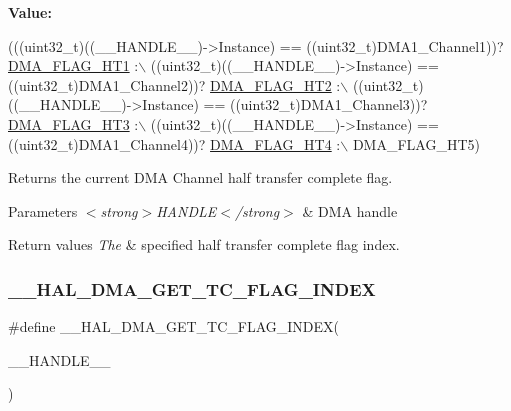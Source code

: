 {\bfseries Value\+:}
\begin{DoxyCode}
(((uint32\_t)((\_\_HANDLE\_\_)->Instance) == ((uint32\_t)DMA1\_Channel1))? \hyperlink{group___d_m_a__flag__definitions_ga4317f6260e1aecc4f5fe882fc043f606}{DMA\_FLAG\_HT1} :\(\backslash\)
 ((uint32\_t)((\_\_HANDLE\_\_)->Instance) == ((uint32\_t)DMA1\_Channel2))? \hyperlink{group___d_m_a__flag__definitions_gab21f437ec8a55a600e5ca2af9416baba}{DMA\_FLAG\_HT2} :\(\backslash\)
 ((uint32\_t)((\_\_HANDLE\_\_)->Instance) == ((uint32\_t)DMA1\_Channel3))? \hyperlink{group___d_m_a__flag__definitions_gad28ea63fda2c87dd5e2ec08e0ab407d4}{DMA\_FLAG\_HT3} :\(\backslash\)
 ((uint32\_t)((\_\_HANDLE\_\_)->Instance) == ((uint32\_t)DMA1\_Channel4))? \hyperlink{group___d_m_a__flag__definitions_ga1a766ffe9b0138d6ab42819c1a9206f1}{DMA\_FLAG\_HT4} :\(\backslash\)
   DMA\_FLAG\_HT5)
\end{DoxyCode}


Returns the current D\+MA Channel half transfer complete flag. 


\begin{DoxyParams}{Parameters}
{\em $<$strong$>$\+H\+A\+N\+D\+L\+E$<$/strong$>$} & D\+MA handle \\
\hline
\end{DoxyParams}

\begin{DoxyRetVals}{Return values}
{\em The} & specified half transfer complete flag index. \\
\hline
\end{DoxyRetVals}
\mbox{\label{group___d_m_a_ex___exported___macros_gae3feef5ea50ff13a6a5b98cb353c87b0}} 
\subsubsection{\texorpdfstring{\+\_\+\+\_\+\+H\+A\+L\+\_\+\+D\+M\+A\+\_\+\+G\+E\+T\+\_\+\+T\+C\+\_\+\+F\+L\+A\+G\+\_\+\+I\+N\+D\+EX}{\_\_HAL\_DMA\_GET\_TC\_FLAG\_INDEX}}
{\footnotesize\ttfamily \#define \+\_\+\+\_\+\+H\+A\+L\+\_\+\+D\+M\+A\+\_\+\+G\+E\+T\+\_\+\+T\+C\+\_\+\+F\+L\+A\+G\+\_\+\+I\+N\+D\+EX(\begin{DoxyParamCaption}\item[{}]{\+\_\+\+\_\+\+H\+A\+N\+D\+L\+E\+\_\+\+\_\+ }\end{DoxyParamCaption})}

